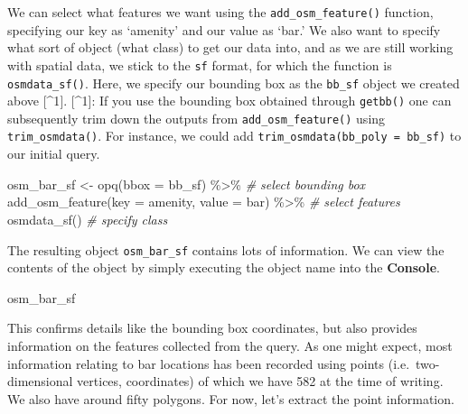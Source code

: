 \documentclass[
]{book}
\newenvironment{Shaded}{\begin{snugshade}}{\end{snugshade}}
\newcommand{\AttributeTok}[1]{\textcolor[rgb]{0.77,0.63,0.00}{#1}}
\newcommand{\CommentTok}[1]{\textcolor[rgb]{0.56,0.35,0.01}{\textit{#1}}}
\newcommand{\FunctionTok}[1]{\textcolor[rgb]{0.00,0.00,0.00}{#1}}
\newcommand{\NormalTok}[1]{#1}
\newcommand{\OtherTok}[1]{\textcolor[rgb]{0.56,0.35,0.01}{#1}}
\newcommand{\SpecialCharTok}[1]{\textcolor[rgb]{0.00,0.00,0.00}{#1}}
\newcommand{\StringTok}[1]{\textcolor[rgb]{0.31,0.60,0.02}{#1}}
\begin{document}
We can select what features we want using the \texttt{add\_osm\_feature()} function, specifying our key as `amenity' and our value as `bar.' We also want to specify what sort of object (what class) to get our data into, and as we are still working with spatial data, we stick to the \texttt{sf} format, for which the function is \texttt{osmdata\_sf()}. Here, we specify our bounding box as the \texttt{bb\_sf} object we created above {[}\^{}1{]}. {[}\^{}1{]}: If you use the bounding box obtained through \texttt{getbb()} one can subsequently trim down the outputs from \texttt{add\_osm\_feature()} using \texttt{trim\_osmdata()}. For instance, we could add \texttt{trim\_osmdata(bb\_poly\ =\ bb\_sf)} to our initial query.

\begin{Shaded}
\begin{Highlighting}[]
\NormalTok{osm\_bar\_sf }\OtherTok{\textless{}{-}} \FunctionTok{opq}\NormalTok{(}\AttributeTok{bbox =}\NormalTok{ bb\_sf) }\SpecialCharTok{\%\textgreater{}\%}    \CommentTok{\# select bounding box}
  \FunctionTok{add\_osm\_feature}\NormalTok{(}\AttributeTok{key =} \StringTok{\textquotesingle{}amenity\textquotesingle{}}\NormalTok{, }\AttributeTok{value =} \StringTok{\textquotesingle{}bar\textquotesingle{}}\NormalTok{) }\SpecialCharTok{\%\textgreater{}\%} \CommentTok{\# select features}
  \FunctionTok{osmdata\_sf}\NormalTok{()          }\CommentTok{\# specify class}
\end{Highlighting}
\end{Shaded}

The resulting object \texttt{osm\_bar\_sf} contains lots of information. We can view the contents of the object by simply executing the object name into the \textbf{Console}.

\begin{Shaded}
\begin{Highlighting}[]
\NormalTok{osm\_bar\_sf}
\end{Highlighting}
\end{Shaded}

This confirms details like the bounding box coordinates, but also provides information on the features collected from the query. As one might expect, most information relating to bar locations has been recorded using points (i.e.~two-dimensional vertices, coordinates) of which we have 582 at the time of writing. We also have around fifty polygons. For now, let's extract the point information.

\begin{Shaded}
\end{Shaded}
\end{document}
